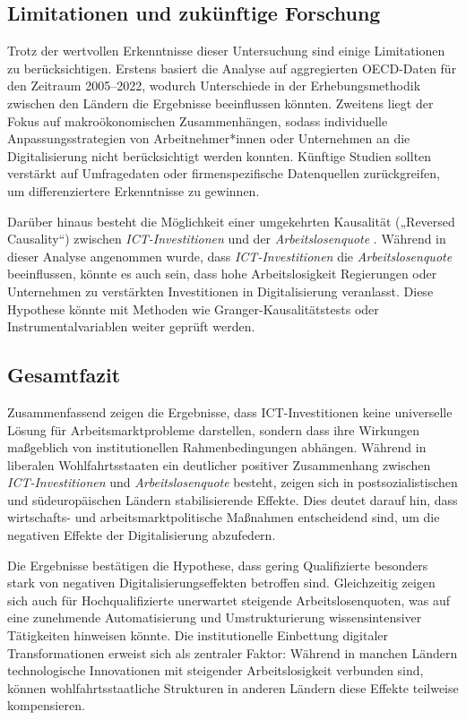 \subsection{Limitationen und zukünftige Forschung}

Trotz der wertvollen Erkenntnisse dieser Untersuchung sind einige Limitationen zu 
berücksichtigen. Erstens basiert die Analyse auf aggregierten \ac{OECD}-Daten für den 
Zeitraum 2005–2022, wodurch Unterschiede in der Erhebungsmethodik zwischen den Ländern 
die Ergebnisse beeinflussen könnten. Zweitens liegt der Fokus auf makroökonomischen 
Zusammenhängen, sodass individuelle Anpassungsstrategien von Arbeitnehmer*innen oder 
Unternehmen an die Digitalisierung nicht berücksichtigt werden konnten. Künftige Studien 
sollten verstärkt auf Umfragedaten oder firmenspezifische Datenquellen zurückgreifen, um 
differenziertere Erkenntnisse zu gewinnen.

Darüber hinaus besteht die Möglichkeit einer umgekehrten Kausalität („Reversed Causality“) 
zwischen \textit{\ac{ICT}-Investitionen} und der \textit{Arbeitslosenquote} 
\parencite[S. 134]{pearl2009causality}. Während in dieser Analyse angenommen wurde, dass 
\textit{\ac{ICT}-Investitionen} die \textit{Arbeitslosenquote} beeinflussen, könnte es 
auch sein, dass hohe Arbeitslosigkeit Regierungen oder Unternehmen zu verstärkten 
Investitionen in Digitalisierung veranlasst. Diese Hypothese könnte mit Methoden wie 
Granger-Kausalitätstests oder Instrumentalvariablen weiter geprüft werden.

\subsection{Gesamtfazit}

Zusammenfassend zeigen die Ergebnisse, dass \ac{ICT}-Investitionen keine universelle 
Lösung für Arbeitsmarktprobleme darstellen, sondern dass ihre Wirkungen maßgeblich von 
institutionellen Rahmenbedingungen abhängen. Während in liberalen Wohlfahrtsstaaten ein 
deutlicher positiver Zusammenhang zwischen \textit{\ac{ICT}-Investitionen} und 
\textit{Arbeitslosenquote} besteht, zeigen sich in postsozialistischen und 
südeuropäischen Ländern stabilisierende Effekte. Dies deutet darauf hin, dass 
wirtschafts- und arbeitsmarktpolitische Maßnahmen entscheidend sind, um die negativen 
Effekte der Digitalisierung abzufedern.

Die Ergebnisse bestätigen die Hypothese, dass gering Qualifizierte besonders stark von 
negativen Digitalisierungseffekten betroffen sind. Gleichzeitig zeigen sich auch für 
Hochqualifizierte unerwartet steigende Arbeitslosenquoten, was auf eine zunehmende 
Automatisierung und Umstrukturierung wissensintensiver Tätigkeiten hinweisen könnte. Die 
institutionelle Einbettung digitaler Transformationen erweist sich als zentraler Faktor: 
Während in manchen Ländern technologische Innovationen mit steigender Arbeitslosigkeit 
verbunden sind, können wohlfahrtsstaatliche Strukturen in anderen Ländern diese Effekte 
teilweise kompensieren.

